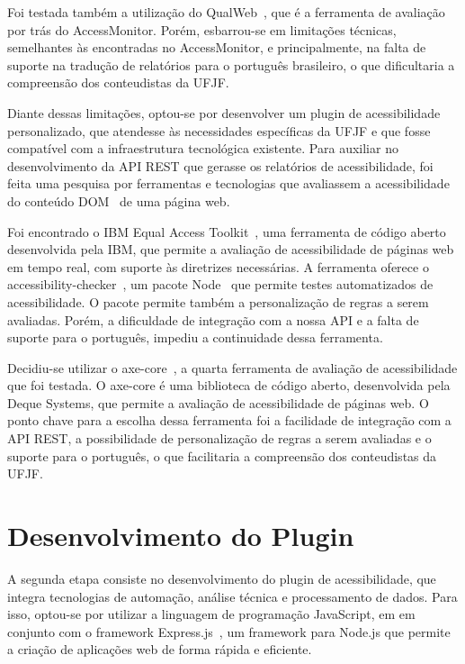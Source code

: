 \documentclass[
    12pt,
    a4paper,
    oneside,
    brazil,
    english
]{article}
\begin{document}
Foi testada também a utilização do QualWeb~\cite{qualweb}, que é a ferramenta
de avaliação por trás do AccessMonitor. Porém, esbarrou-se em limitações técnicas,
semelhantes às encontradas no AccessMonitor, e principalmente, na falta de suporte
na tradução de relatórios para o português brasileiro, o que dificultaria a compreensão dos
conteudistas da UFJF\@.

Diante dessas limitações, optou-se por desenvolver um plugin de acessibilidade
personalizado, que atendesse às necessidades específicas da UFJF e que fosse
compatível com a infraestrutura tecnológica existente. Para auxiliar no
desenvolvimento da API REST que gerasse os relatórios de acessibilidade,
foi feita uma pesquisa por ferramentas e tecnologias que avaliassem a acessibilidade
do conteúdo DOM~\cite{DOM} de uma página web.

Foi encontrado o IBM Equal Access Toolkit~\cite{IBMa}, uma ferramenta de código
aberto desenvolvida pela IBM, que permite a avaliação de acessibilidade de páginas
web em tempo real, com suporte às diretrizes necessárias. A ferramenta oferece
o accessibility-checker~\cite{AC}, um pacote Node~\cite{Node} que permite
testes automatizados de acessibilidade. O pacote permite também a personalização de
regras a serem avaliadas. Porém, a dificuldade de integração com a nossa API e a falta de suporte para o
português, impediu a continuidade dessa ferramenta.

Decidiu-se utilizar o axe-core~\cite{axecore}, a quarta
ferramenta de avaliação de acessibilidade que foi testada. O axe-core é uma biblioteca
de código aberto, desenvolvida pela Deque Systems, que permite a avaliação de acessibilidade
de páginas web. O ponto chave para a escolha dessa ferramenta foi a facilidade
de integração com a API REST, a possibilidade de personalização de regras a serem
avaliadas e o suporte para o português, o que facilitaria a compreensão dos conteudistas
da UFJF\@.

\section*{Desenvolvimento do Plugin}
A segunda etapa consiste no desenvolvimento do plugin de acessibilidade, que
integra tecnologias de automação, análise técnica e processamento de
dados. Para isso, optou-se por utilizar a linguagem de programação JavaScript, em
em conjunto com o framework Express.js~\cite{express}, um framework
para Node.js que permite a criação de aplicações web de forma rápida
e eficiente.
\end{document}
